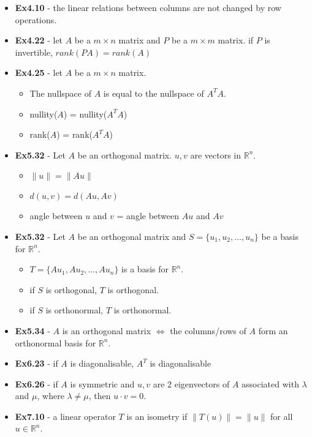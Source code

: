 \documentclass[10pt]{article}
\let\Iff\Leftrightarrow
\begin{document}
\begin{itemize}
\begin{itemize}
    \end{itemize}
    \item \textbf{Ex4.10} - the linear relations between columns are not changed by row operations.
    \item \textbf{Ex4.22} - let $A$ be a $m \times n$ matrix and $P$ be a $m \times m$ matrix. if $P$ is invertible, $rank(PA) = rank(A)$
    \item \textbf{Ex4.25} - let $A$ be a $m \times n$ matrix. 
    \begin{itemize}
        \item The nullspace of $A$ is equal to the nullspace of $A^TA$.
        \item nullity($A$) = nullity($A^TA$)
        \item rank($A$) = rank($A^TA$)
    \end{itemize}
    \item \textbf{Ex5.32} - Let $A$ be an orthogonal matrix. $u, v$ are vectors in $\mathbb{R}^n$.
    \begin{itemize}
        \item $\| u \| = \| Au \|$
        \item $d(u, v) = d(Au, Av)$
        \item angle between $u$ and $v$ = angle between $Au$ and $Av$ 
    \end{itemize}
    \item \textbf{Ex5.32} - Let $A$ be an orthogonal matrix and $S = \{u_1, u_2, \dots, u_n\}$ be a basis for $\mathbb{R}^n$.
    \begin{itemize}
        \item $T = \{Au_1, Au_2, \dots, Au_n\}$ is a basis for $\mathbb{R}^n$.
        \item if $S$ is orthogonal, $T$ is orthogonal. 
        \item if $S$ is orthonormal, $T$ is orthonormal. 
    \end{itemize}
    \item \textbf{Ex5.34} - $A$ is an orthogonal matrix $\Iff$ the columns/rows of $A$ form an orthonormal basis for $\mathbb{R}^n$.
    \item \textbf{Ex6.23} - if $A$ is diagonalisable, $A^T$ is diagonalisable
    \item \textbf{Ex6.26} - if $A$ is symmetric and $u, v$ are 2 eigenvectors of $A$ associated with $\lambda$ and $\mu$, where $\lambda \neq \mu$, then $u \cdot v = 0$.
    \item \textbf{Ex7.10} - a linear operator $T$ is an isometry if $\|T(u)\| = \|u\|$ for all $u \in \mathbb{R}^n$.

\end{itemize}
\end{document}
